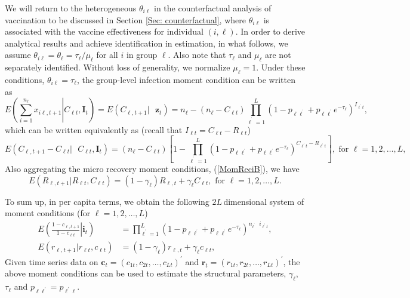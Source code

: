 \documentclass[12pt]{article}
\begin{document}
We will return to the heterogeneous $\theta_{i\ell}$ in the counterfactual
analysis of vaccination to be discussed in Section \ref{Sec: counterfactual},
where $\theta_{i\ell}$ is associated with the vaccine effectiveness for
individual $(i,\ell)$. In order to derive analytical results and achieve
identification in estimation, in what follows, we assume $\theta_{i\ell
}=\theta_{\ell}=\tau_{\ell}/\mu_{\ell}$ for all $i$ in group $\ell$. Also note
that $\tau_{\ell}$ and $\mu_{\ell}$ are not separately identified. Without
loss of generality, we normalize $\mu_{\ell}=1$. Under these conditions,
$\theta_{i\ell}=\tau_{\ell}$, the group-level infection moment condition can
be written as
\[
E\left(  \left.  \sum_{i=1}^{n_{\ell}}x_{i\ell,t+1}\right\vert C_{\ell
t},\mathbf{I}_{t}\right)  =E\left(  C_{\ell,t+1}|\text{ }\mathbf{z}%
_{t}\right)  =n_{\ell}-\left(  n_{\ell}-C_{\ell t}\right)  \prod
_{\ell^{^{\prime}}=1}^{L}\left(  1-p_{\ell\ell^{^{\prime}}}+p_{\ell
\ell^{^{\prime}}}e^{-\tau_{\ell}}\right)  ^{I_{\ell^{\prime}t}},
\]
which can be written equivalently as (recall that $I_{\ell t}=C_{\ell
t}-R_{\ell t}$)
\begin{equation}
E\left(  C_{\ell,t+1}-C_{\ell t}|\text{ }C_{\ell t},\mathbf{I}_{t}\right)
=\left(  n_{\ell}-C_{\ell t}\right)  \left[  1-\prod_{\ell^{^{\prime}}=1}%
^{L}\left(  1-p_{\ell\ell^{^{\prime}}}+p_{\ell\ell^{^{\prime}}}e^{-\tau_{\ell
}}\right)  ^{C_{\ell^{\prime}t}-R_{\ell^{\prime}t}}\right]  ,\text{ for }%
\ell=1,2,\ldots,L, \label{Clagg}%
\end{equation}
Also aggregating the micro recovery moment conditions, (\ref{MomReciB}), we
have%
\begin{equation}
E\left(  R_{\ell,t+1}|R_{\ell t},C_{\ell t}\right)  =\left(  1-\gamma_{\ell
}\right)  R_{\ell,t}+\gamma_{\ell}C_{\ell t},\text{ for }\ell=1,2,\ldots,L.
\label{MomRec2}%
\end{equation}


To sum up, in per capita terms, we obtain the following $2L\,$dimensional
system of moment conditions (for $\ell=1,2,\ldots,L$)%
\begin{align}
E\left(  \left.  \frac{1-c_{\ell,t+1}}{1-c_{\ell t}}\right\vert \text{
}\mathbf{i}_{t}\right)   &  =\prod_{\ell^{^{\prime}}=1}^{L}\left(
1-p_{\ell\ell^{^{\prime}}}+p_{\ell\ell^{^{\prime}}}e^{-\tau_{\ell}}\right)
^{n_{\ell^{^{\prime}}}\text{ }i_{\ell^{\prime}t}},\label{clmoments}\\
E\left(  r_{\ell,t+1}|r_{\ell t},c_{\ell t}\right)   &  =\left(
1-\gamma_{\ell}\right)  r_{\ell,t}+\gamma_{\ell}c_{\ell t}, \label{rlmoments}%
\end{align}
Given time series data on $\mathbf{c}_{t}=(c_{1t},c_{2t},\ldots,c_{Lt}%
)^{\prime}$ and $\mathbf{r}_{t}=(r_{1t},r_{2t},\ldots,r_{Lt})^{\prime}$, the
above moment conditions can be used to estimate the structural parameters,
$\gamma_{\ell}$, $\tau_{\ell}$ and $p_{\ell\ell^{\prime}}=p_{\ell^{\prime}%
\ell}$.
\end{document}
